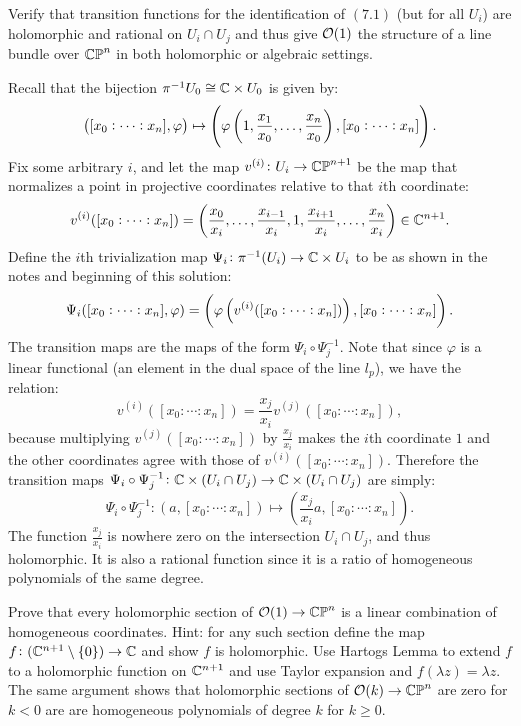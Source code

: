 \documentclass[11pt, a4paper]{article}
\begin{document}
\begin{exercise}
  Verify that transition functions for the identification of $(7.1)$
  (but for all $U_i$) are holomorphic and rational on $U_i \cap U_j$
  and thus give $\mathcal{O}(1)$ the structure of a line bundle over $\mathbb{CP}^n$
  in both holomorphic or algebraic settings.
\end{exercise}
\begin{solution}
  Recall that the bijection $\pi^{-1} U_0 \cong \mathbb{C} \times U_0$
  is given by:
  \[
    \del{[x_0 : \cdots : x_n],\varphi} \mapsto
    \del{\varphi\del{1,\frac{x_1}{x_0},\dots,\frac{x_n}{x_0}},[x_0 : \cdots : x_n]}.
  \]
  Fix some arbitrary $i$,
  and let the map $v^{(i)} \colon U_i \to \mathbb{CP}^{n+1}$
  be the map that normalizes a point in projective coordinates
  relative to that $i$th coordinate:
  \[
    v^{(i)}([x_0 : \cdots : x_n]) =
    \del{\frac{x_0}{x_i},\dots,\frac{x_{i-1}}{x_i},1,\frac{x_{i+1}}{x_i},\dots,\frac{x_n}{x_i}}
    \in \C^{n+1}.
  \]
  Define the $i$th trivialization map
  $\Psi_i \colon \pi^{-1}(U_i) \to \mathbb{C} \times U_i$ to be
  as shown in the notes and beginning of this solution:
  \[
    \Psi_i([x_0 : \cdots : x_n],\varphi) =
    \del{\varphi\del{v^{(i)}([x_0 : \cdots : x_n])},[x_0 : \cdots : x_n]}.
  \]
  The transition maps are the maps of the form $\Psi_i \circ \Psi_j^{-1}$.
  Note that since $\varphi$ is a linear functional (an element in the dual
  space of the line $l_p$),
  we have the relation:
  \[
    v^{(i)}\left([x_0 : \cdots : x_n]\right) =
    \frac{x_j}{x_i} v^{(j)}\left([x_0 : \cdots : x_n]\right),
  \]
  because multiplying $v^{(j)}([x_0 : \cdots : x_n])$
  by $\frac{x_j}{x_i}$ makes the $i$th coordinate $1$ and the other coordinates
  agree with those of $v^{(i)}([x_0 : \cdots : x_n])$.
  Therefore the transition maps
  $\Psi_i \circ \Psi_j^{-1} \colon \mathbb{C} \times (U_i \cap U_j) \to \mathbb{C} \times (U_i \cap U_j)$
  are simply:
  \[
    \Psi_i \circ \Psi_j^{-1} \colon
    \left(a,[x_0 : \cdots : x_n]\right) \mapsto
    \left(\frac{x_j}{x_i} a,[x_0 : \cdots : x_n]\right).
  \]
  The function $\frac{x_j}{x_i}$ is nowhere zero on the intersection
  $U_i \cap U_j$, and thus holomorphic.
  It is also a rational function since it is a ratio of homogeneous
  polynomials of the same degree.
\end{solution}

\begin{exercise}
  Prove that every holomorphic section of $\mathcal{O}(1) \to \mathbb{CP}^n$
  is a linear combination of homogeneous coordinates.
  Hint: for any such
  section define the map $f \colon (\mathbb{C}^{n+1} \setminus \left\{0\right\}) \to \mathbb{C}$
  and show $f$ is holomorphic.
  Use Hartogs Lemma to extend $f$ to a holomorphic function on $\mathbb{C}^{n+1}$ and
  use Taylor expansion and $f(\lambda z) = \lambda z$.
  The same argument shows that
  holomorphic sections of $\mathcal{O}(k) \to \mathbb{CP}^n$ are zero for $k < 0$
  are are homogeneous polynomials of degree $k$ for $k \geq 0$.
\end{exercise}
\begin{solution}
\end{solution}
\end{document}
